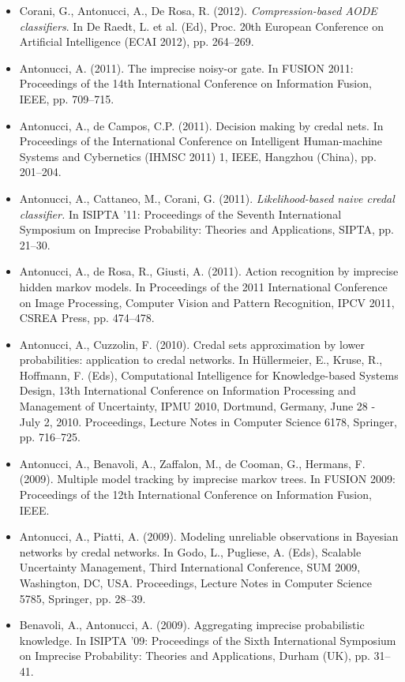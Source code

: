 \documentclass[11pt,a4paper]{moderncv}
\begin{document}
\begin{itemize}
\item Corani, G., Antonucci, A., De Rosa, R. (2012). \textit{Compression-based AODE classifiers}. In De Raedt, L. et al. (Ed), Proc. 20th European Conference on Artificial Intelligence (ECAI 2012), pp. 264--269.
\item Antonucci, A. (2011). The imprecise noisy-or gate. In FUSION 2011: Proceedings of the 14th International Conference on Information Fusion, IEEE, pp. 709--715.
\item Antonucci, A., de Campos, C.P. (2011). Decision making by credal nets. In Proceedings of the International Conference on Intelligent Human-machine Systems and Cybernetics (IHMSC 2011) 1, IEEE, Hangzhou (China), pp. 201--204.
\item Antonucci, A., Cattaneo, M., Corani, G. (2011). \textit{Likelihood-based naive credal classifier.} In ISIPTA '11: Proceedings of the Seventh International Symposium on Imprecise Probability: Theories and Applications, SIPTA, pp. 21--30.
\item Antonucci, A., de Rosa, R., Giusti, A. (2011). Action recognition by imprecise hidden markov models. In Proceedings of the 2011 International Conference on Image Processing, Computer Vision and Pattern Recognition, IPCV 2011, CSREA Press, pp. 474--478.
\item Antonucci, A., Cuzzolin, F. (2010). Credal sets approximation by lower probabilities: application to credal networks. In Hüllermeier, E., Kruse, R., Hoffmann, F. (Eds), Computational Intelligence for Knowledge-based Systems Design, 13th International Conference on Information Processing and Management of Uncertainty, IPMU 2010, Dortmund, Germany, June 28 - July 2, 2010. Proceedings, Lecture Notes in Computer Science 6178, Springer, pp. 716--725.
\item Antonucci, A., Benavoli, A., Zaffalon, M., de Cooman, G., Hermans, F. (2009). Multiple model tracking by imprecise markov trees. In FUSION 2009: Proceedings of the 12th International Conference on Information Fusion, IEEE.
\item Antonucci, A., Piatti, A. (2009). Modeling unreliable observations in Bayesian networks by credal networks. In Godo, L., Pugliese, A. (Eds), Scalable Uncertainty Management, Third International Conference, SUM 2009, Washington, DC, USA. Proceedings, Lecture Notes in Computer Science 5785, Springer, pp. 28--39.
\item Benavoli, A., Antonucci, A. (2009). Aggregating imprecise probabilistic knowledge. In ISIPTA '09: Proceedings of the Sixth International Symposium on Imprecise Probability: Theories and Applications, Durham (UK), pp. 31--41.
\end{itemize}
\end{document}
